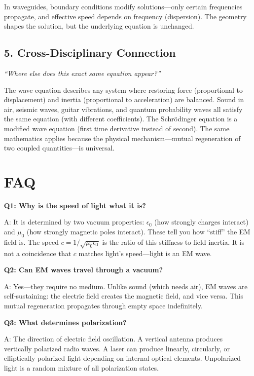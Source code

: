 In waveguides, boundary conditions modify solutions---only certain frequencies propagate, and effective speed depends on frequency (dispersion). The geometry shapes the solution, but the underlying equation is unchanged.

\subsection*{5. Cross-Disciplinary Connection}
\textit{``Where else does this exact same equation appear?''}

The wave equation describes any system where restoring force (proportional to displacement) and inertia (proportional to acceleration) are balanced. Sound in air, seismic waves, guitar vibrations, and quantum probability waves all satisfy the same equation (with different coefficients). The Schr\"odinger equation is a modified wave equation (first time derivative instead of second). The same mathematics applies because the physical mechanism---mutual regeneration of two coupled quantities---is universal.


\section*{FAQ}

\textbf{Q1: Why is the speed of light what it is?}

A: It is determined by two vacuum properties: $\epsilon_0$ (how strongly charges interact) and $\mu_0$ (how strongly magnetic poles interact). These tell you how ``stiff'' the EM field is. The speed $c = 1/\sqrt{\mu_0 \epsilon_0}$ is the ratio of this stiffness to field inertia. It is not a coincidence that $c$ matches light's speed---light is an EM wave.

\textbf{Q2: Can EM waves travel through a vacuum?}

A: Yes---they require no medium. Unlike sound (which needs air), EM waves are self-sustaining: the electric field creates the magnetic field, and vice versa. This mutual regeneration propagates through empty space indefinitely.

\textbf{Q3: What determines polarization?}

A: The direction of electric field oscillation. A vertical antenna produces vertically polarized radio waves. A laser can produce linearly, circularly, or elliptically polarized light depending on internal optical elements. Unpolarized light is a random mixture of all polarization states.
